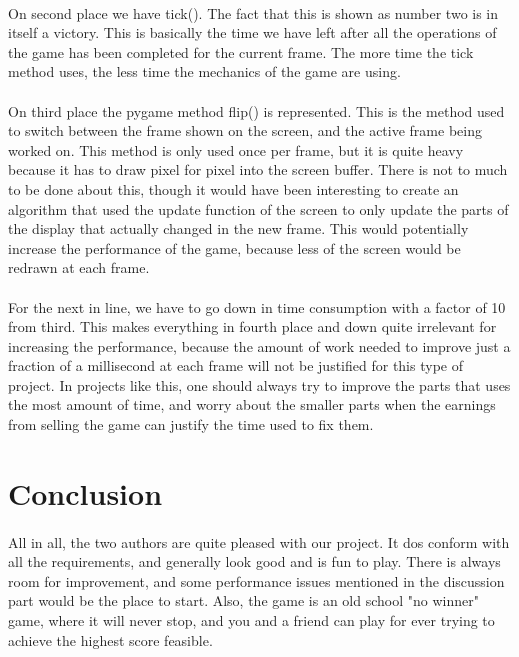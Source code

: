 \documentclass{article}
\begin{document}
\paragraph{}
On second place we have tick(). The fact that this is shown as number two is in itself a victory. This is basically the time we have left after all the operations of the game has been completed for the current frame. The more time the tick method uses, the less time the mechanics of the game are using.
\paragraph{}
On third place the pygame method flip() is represented. This is the method used to switch between the frame shown on the screen, and the active frame being worked on. This method is only used once per frame, but it is quite heavy because it has to draw pixel for pixel into the screen buffer. There is not to much to be done about this, though it would have been interesting to create an algorithm that used the update function of the screen to only update the parts of the display that actually changed in the new frame. This would potentially increase the performance of the game, because less of the screen would be redrawn at each frame.
\paragraph{}
For the next in line, we have to go down in time consumption with a factor of 10 from third. This makes everything in fourth place and down quite irrelevant for increasing the performance, because the amount of work needed to improve just a fraction of a millisecond at each frame will not be justified for this type of project. In projects like this, one should always try to improve the parts that uses the most amount of time, and worry about the smaller parts when the earnings from selling the game can justify the time used to fix them.





\section{Conclusion}
\paragraph{}
All in all, the two authors are quite pleased with our project. It dos conform with all the requirements, and generally look good and is fun to play. There is always room for improvement, and some performance issues mentioned in the discussion part would be the place to start. Also, the game is an old school "no winner" game, where it will never stop, and you and a friend can play for ever trying to achieve the highest score feasible.
\end{document}
